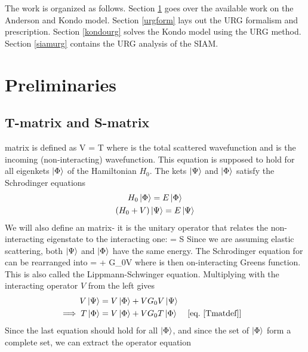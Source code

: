 \documentclass[12pt,twoside]{article}
\numberwithin{equation}{section}
\begin{document}
The work is organized as follows. Section \ref{section1} goes over the available work on the Anderson and Kondo model. Section \ref{urgform} lays out the URG formalism and prescription. Section \ref{kondourg} solves the Kondo model using the URG method. Section \ref{siamurg} contains the URG analysis of the SIAM.
\section{Preliminaries}\label{section1}
\subsection{T-matrix and S-matrix}
matrix is defined as\cite{sakurai}
\beq
\label{Tmatdef}
V\ket{\Psi} = T\ket{\Phi}
\eeq
where \il{\ket{\Psi}} is the total scattered wavefunction and \il{\ket{\Phi}} is the incoming (non-interacting) wavefunction. This equation is supposed to hold for all eigenkets \(\ket{\Phi}\) of the Hamiltonian \(H_0\). 
\pb The kets \(\ket{\Psi}\) and \(\ket{\Phi}\) satisfy the Schrodinger equations
\begin{gather}
	H_0 \ket{\Phi} = E \ket{\Phi}\\
(H_0 + V)\ket{\Psi} = E \ket{\Psi}
\end{gather}
We will also define an matrix- it is the unitary operator that relates the non-interacting eigenstate to the interacting one:
\beq
\label{Smatdef}
\ket{\Psi} = S\ket{\Phi}
\eeq
Since we are assuming elastic scattering, both \(\ket{\Psi}\) and \(\ket{\Phi}\) have the same energy.
The Schrodinger equation for \il{\ket{\Psi}} can be rearranged into
\beq[lse]
\ket{\Psi} = \ket{\Phi} + G_0V\ket{\Psi}
\eeq
where  is then on-interacting Greens function.
This is also called the Lippmann-Schwinger equation.
Multiplying with the interacting operator \(V\) from the left gives
\begin{equation}\begin{aligned}
	V\ket{\Psi} &= V\ket{\Phi} + VG_0V\ket{\Psi}\\
	\implies T\ket{\Phi} &= V\ket{\Phi} + VG_0 T\ket{\Phi} && \left[ \text{eq.~\ref{Tmatdef}} \right] 
\end{aligned}\end{equation}
Since the last equation should hold for all \(\ket{\Phi}\), and since the set of \(\ket{\Phi}\) form a complete set, we can extract the operator equation
\end{document}
